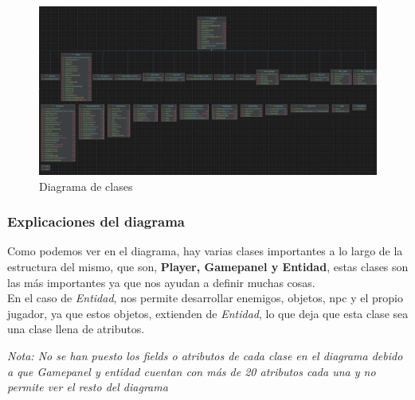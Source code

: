 \documentclass[a4paper]{article}
\begin{document}
\begin{figure}[ht]
    \centering
    \includegraphics[width=1\textwidth]{Images/diagramadeclases.png}
    \caption{Diagrama de clases}
    \label{fig:diagrama-clases}
\end{figure}


\subsubsection{Explicaciones del diagrama}
Como podemos ver en el diagrama, hay varias clases importantes a lo largo de la estructura del mismo, que son, \textbf{Player, Gamepanel y Entidad}, estas clases son las más importantes ya que
nos ayudan a definir muchas cosas.\\
En el caso de \textit{Entidad}, nos permite desarrollar enemigos, objetos, npc y el propio jugador, ya que estos objetos, extienden de \textit{Entidad}, lo que deja que esta clase sea una clase llena de atributos.
\begin{flushright}
    \textit{Nota: No se han puesto los fields o atributos de cada clase en el diagrama debido a que Gamepanel y entidad cuentan con más de 20 atributos cada una y no permite ver el resto del diagrama}
\end{flushright}
\end{document}
